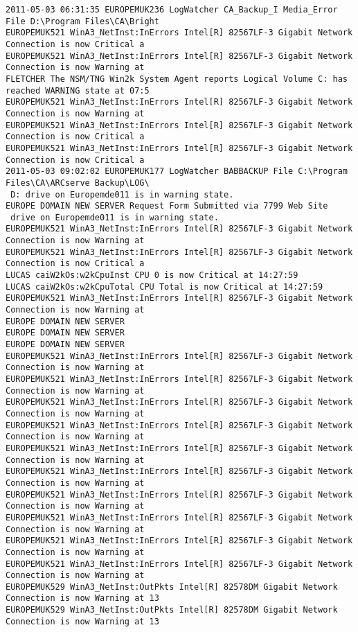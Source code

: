 \begin{lstlisting}
2011-05-03 06:31:35 EUROPEMUK236 LogWatcher CA_Backup_I Media_Error File D:\Program Files\CA\Bright
EUROPEMUK521 WinA3_NetInst:InErrors Intel[R] 82567LF-3 Gigabit Network Connection is now Critical a
EUROPEMUK521 WinA3_NetInst:InErrors Intel[R] 82567LF-3 Gigabit Network Connection is now Warning at
FLETCHER The NSM/TNG Win2k System Agent reports Logical Volume C: has reached WARNING state at 07:5
EUROPEMUK521 WinA3_NetInst:InErrors Intel[R] 82567LF-3 Gigabit Network Connection is now Warning at
EUROPEMUK521 WinA3_NetInst:InErrors Intel[R] 82567LF-3 Gigabit Network Connection is now Critical a
EUROPEMUK521 WinA3_NetInst:InErrors Intel[R] 82567LF-3 Gigabit Network Connection is now Critical a
2011-05-03 09:02:02 EUROPEMUK177 LogWatcher BABBACKUP File C:\Program Files\CA\ARCserve Backup\LOG\
 D: drive on Europemde011 is in warning state.
EUROPE DOMAIN NEW SERVER Request Form Submitted via 7799 Web Site
 drive on Europemde011 is in warning state.
EUROPEMUK521 WinA3_NetInst:InErrors Intel[R] 82567LF-3 Gigabit Network Connection is now Warning at
EUROPEMUK521 WinA3_NetInst:InErrors Intel[R] 82567LF-3 Gigabit Network Connection is now Critical a
LUCAS caiW2kOs:w2kCpuInst CPU 0 is now Critical at 14:27:59
LUCAS caiW2kOs:w2kCpuTotal CPU Total is now Critical at 14:27:59
EUROPEMUK521 WinA3_NetInst:InErrors Intel[R] 82567LF-3 Gigabit Network Connection is now Warning at
EUROPE DOMAIN NEW SERVER
EUROPE DOMAIN NEW SERVER
EUROPE DOMAIN NEW SERVER
EUROPEMUK521 WinA3_NetInst:InErrors Intel[R] 82567LF-3 Gigabit Network Connection is now Warning at
EUROPEMUK521 WinA3_NetInst:InErrors Intel[R] 82567LF-3 Gigabit Network Connection is now Warning at
EUROPEMUK521 WinA3_NetInst:InErrors Intel[R] 82567LF-3 Gigabit Network Connection is now Warning at
EUROPEMUK521 WinA3_NetInst:InErrors Intel[R] 82567LF-3 Gigabit Network Connection is now Warning at
EUROPEMUK521 WinA3_NetInst:InErrors Intel[R] 82567LF-3 Gigabit Network Connection is now Warning at
EUROPEMUK521 WinA3_NetInst:InErrors Intel[R] 82567LF-3 Gigabit Network Connection is now Warning at
EUROPEMUK521 WinA3_NetInst:InErrors Intel[R] 82567LF-3 Gigabit Network Connection is now Warning at
EUROPEMUK521 WinA3_NetInst:InErrors Intel[R] 82567LF-3 Gigabit Network Connection is now Warning at
EUROPEMUK521 WinA3_NetInst:InErrors Intel[R] 82567LF-3 Gigabit Network Connection is now Warning at
EUROPEMUK521 WinA3_NetInst:InErrors Intel[R] 82567LF-3 Gigabit Network Connection is now Warning at
EUROPEMUK529 WinA3_NetInst:OutPkts Intel[R] 82578DM Gigabit Network Connection is now Warning at 13
EUROPEMUK529 WinA3_NetInst:OutPkts Intel[R] 82578DM Gigabit Network Connection is now Warning at 13

\end{lstlisting}
